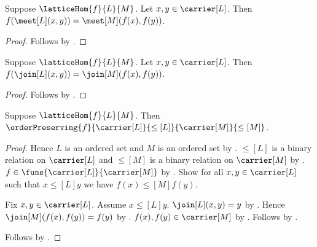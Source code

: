 \begin{proposition}\label{lattice_hom_meet}
    Suppose $\latticeHom{f}{L}{M}$.
    Let $x,y\in\carrier[L]$.
    Then $f(\meet[L](x,y))=\meet[M](f(x),f(y))$.
\end{proposition}
\begin{proof}
    Follows by .
\end{proof}

\begin{proposition}\label{lattice_hom_join}
    Suppose $\latticeHom{f}{L}{M}$.
    Let $x,y\in\carrier[L]$.
    Then $f(\join[L](x,y))=\join[M](f(x),f(y))$.
\end{proposition}
\begin{proof}
    Follows by .
\end{proof}

\begin{theorem}\label{lattice_hom_order_preserving}
    Suppose $\latticeHom{f}{L}{M}$.
    Then
        $\orderPreserving
            {f}{\carrier[L]}{\leq[L]}{\carrier[M]}{\leq[M]}$.
\end{theorem}
\begin{proof}
    Hence $L$ is an ordered set and $M$ is an ordered set by
        .
    $\leq[L]$ is a binary relation on $\carrier[L]$ and
        $\leq[M]$ is a binary relation on $\carrier[M]$ by
        .
    $f\in\funs{\carrier[L]}{\carrier[M]}$ by
        .
    Show for all $x,y\in\carrier[L]$ such that
        $x\mathrel{\leq[L]}y$ we have
        $f(x)\mathrel{\leq[M]}f(y)$.
    \begin{subproof}
        Fix $x,y\in\carrier[L]$.
        Assume $x\mathrel{\leq[L]}y$.
        $\join[L](x,y)=y$ by
            .
        Hence $\join[M](f(x),f(y))=f(y)$ by
            .
        $f(x),f(y)\in\carrier[M]$ by
            .
        Follows by
            .
    \end{subproof}
    Follows by .
\end{proof}

